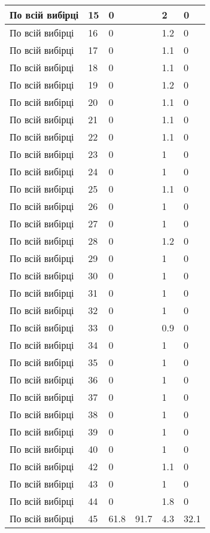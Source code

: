 \begin{longtable}[c]{ | p{2cm} | p{2cm} | p{2cm} | p{2cm} | p{3cm} | p{3cm} | }
	\hline
	По всій вибірці & 15 & 0 &  & 2 & 0 \\
	\hline
	По всій вибірці & 16 & 0 &  & 1.2 & 0 \\
	\hline
	По всій вибірці & 17 & 0 &  & 1.1 & 0 \\
	\hline
	По всій вибірці & 18 & 0 &  & 1.1 & 0 \\
	\hline
	По всій вибірці & 19 & 0 &  & 1.2 & 0 \\
	\hline
	По всій вибірці & 20 & 0 &  & 1.1 & 0 \\
	\hline
	По всій вибірці & 21 & 0 &  & 1.1 & 0 \\
	\hline
	По всій вибірці & 22 & 0 &  & 1.1 & 0 \\
	\hline
	По всій вибірці & 23 & 0 &  & 1 & 0 \\
	\hline
	По всій вибірці & 24 & 0 &  & 1 & 0 \\
	\hline
	По всій вибірці & 25 & 0 &  & 1.1 & 0 \\
	\hline
	По всій вибірці & 26 & 0 &  & 1 & 0 \\
	\hline
	По всій вибірці & 27 & 0 &  & 1 & 0 \\
	\hline
	По всій вибірці & 28 & 0 &  & 1.2 & 0 \\
	\hline
	По всій вибірці & 29 & 0 &  & 1 & 0 \\
	\hline
	По всій вибірці & 30 & 0 &  & 1 & 0 \\
	\hline
	По всій вибірці & 31 & 0 &  & 1 & 0 \\
	\hline
	По всій вибірці & 32 & 0 &  & 1 & 0 \\
	\hline
	По всій вибірці & 33 & 0 &  & 0.9 & 0 \\
	\hline
	По всій вибірці & 34 & 0 &  & 1 & 0 \\
	\hline
	По всій вибірці & 35 & 0 &  & 1 & 0 \\
	\hline
	По всій вибірці & 36 & 0 &  & 1 & 0 \\
	\hline
	По всій вибірці & 37 & 0 &  & 1 & 0 \\
	\hline
	По всій вибірці & 38 & 0 &  & 1 & 0 \\
	\hline
	По всій вибірці & 39 & 0 &  & 1 & 0 \\
	\hline
	По всій вибірці & 40 & 0 &  & 1 & 0 \\
	\hline
	По всій вибірці & 42 & 0 &  & 1.1 & 0 \\
	\hline
	По всій вибірці & 43 & 0 &  & 1 & 0 \\
	\hline
	По всій вибірці & 44 & 0 &  & 1.8 & 0 \\
	\hline
	По всій вибірці & 45 & 61.8 & 91.7 & 4.3 & 32.1 \\

\end{longtable}
